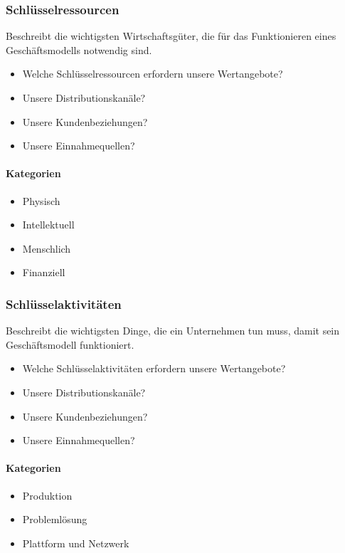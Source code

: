 \subsubsection{Schlüsselressourcen}
Beschreibt die wichtigsten Wirtschaftsgüter, die für das Funktionieren eines Geschäftsmodells notwendig sind.
\begin{itemize}
	\item Welche Schlüsselressourcen erfordern unsere Wertangebote?
	\item Unsere Distributionskanäle?
	\item Unsere Kundenbeziehungen?
	\item Unsere Einnahmequellen?
\end{itemize}

\paragraph{Kategorien}
\begin{multicols}{4}
	\begin{itemize}
		\item Physisch
		\item Intellektuell
		\item Menschlich
		\item Finanziell
	\end{itemize}
\end{multicols}

\subsubsection{Schlüsselaktivitäten}
Beschreibt die wichtigsten Dinge, die ein Unternehmen tun muss, damit sein Geschäftsmodell funktioniert.
\begin{itemize}
	\item Welche Schlüsselaktivitäten erfordern unsere Wertangebote?
	\item Unsere Distributionskanäle?
	\item Unsere Kundenbeziehungen?
	\item Unsere Einnahmequellen?
\end{itemize}

\paragraph{Kategorien}
\begin{multicols}{3}
	\begin{itemize}
		\item Produktion
		\item Problemlösung
		\item Plattform und Netzwerk
	\end{itemize}
\end{multicols}

